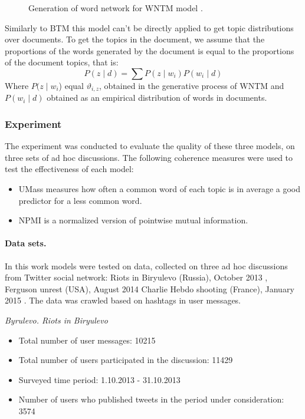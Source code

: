 \begin{figure}[ht]
	\caption{Generation of word network for WNTM model \cite{KeYuanJichang}.}\label{fig:wntmGeneration}
\end{figure}

Similarly to BTM this model can’t be directly applied to get topic distributions over documents. To get the topics in the document, we assume that the proportions of the words generated by the document is equal to the proportions of the document topics, that is:
\begin{equation}
	\label{eqn:30}
	P(z \mid d) = \sum P(z \mid w_i) P(w_i \mid d)
\end{equation}
Where \(P(z \mid w_i\)) equal \(\vartheta_{i,z}\), obtained in the generative process of WNTM and \(P(w_i \mid d)\) obtained as an empirical distribution of words in documents.

\subsubsection{Experiment}

The experiment was conducted to evaluate the quality of these three models, on three sets of ad hoc discussions. The following coherence measures were used to test the effectiveness of each model:

\begin{itemize}
	\item UMass \cite{MimnoWallachTalley} measures how often a common word of each topic is in average a good predictor for a less common word.
	\item NPMI \cite{StevesonAletras} is a normalized version of pointwise mutual information.
\end{itemize}

\paragraph{Data sets.} In this work models were tested on data, collected on three ad hoc discussions from Twitter social network: Riots in Biryulevo (Russia), October 2013 \cite{BodrunovaLitvinenkoBlekanov}, Ferguson unrest (USA), August 2014 \cite{SmoliarovaBlekanovBodrunova} Charlie Hebdo shooting (France), January 2015 \cite{SmoliarovaBlekanovLitvinenko}. The data was crawled based on hashtags in user messages.

\textit{Byrulevo. Riots in Biryulevo}
\begin{itemize}
	\item Total number of user messages: 10215
	\item Total number of users participated in the discussion: 11429
	\item Surveyed time period: 1.10.2013 - 31.10.2013
	\item Number of users who published tweets in the period under consideration: 3574
\end{itemize}

